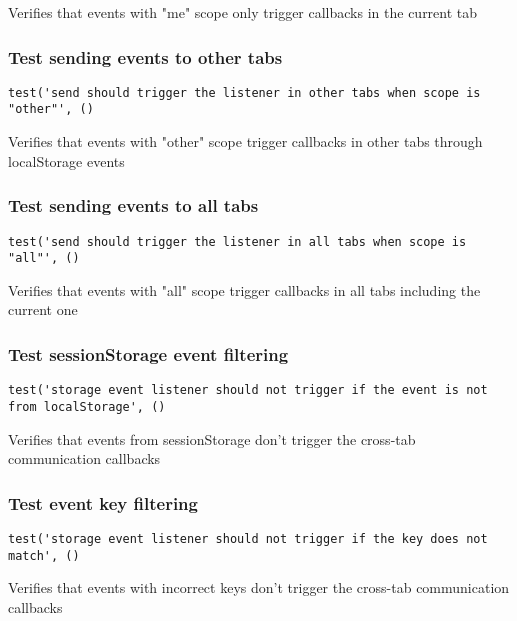 \documentclass[a4paper]{article}
\begin{document}
Verifies that events with "me" scope only trigger callbacks
in the current tab

\hypertarget{toc733}{}
\subsubsection{Test sending events to other tabs}

\begin{lstlisting}
test('send should trigger the listener in other tabs when scope is "other"', ()
\end{lstlisting}

Verifies that events with "other" scope trigger callbacks
in other tabs through localStorage events

\hypertarget{toc734}{}
\subsubsection{Test sending events to all tabs}

\begin{lstlisting}
test('send should trigger the listener in all tabs when scope is "all"', ()
\end{lstlisting}

Verifies that events with "all" scope trigger callbacks
in all tabs including the current one

\hypertarget{toc735}{}
\subsubsection{Test sessionStorage event filtering}

\begin{lstlisting}
test('storage event listener should not trigger if the event is not from localStorage', ()
\end{lstlisting}

Verifies that events from sessionStorage don't trigger
the cross-tab communication callbacks

\hypertarget{toc736}{}
\subsubsection{Test event key filtering}

\begin{lstlisting}
test('storage event listener should not trigger if the key does not match', ()
\end{lstlisting}

Verifies that events with incorrect keys don't trigger
the cross-tab communication callbacks
\end{document}
